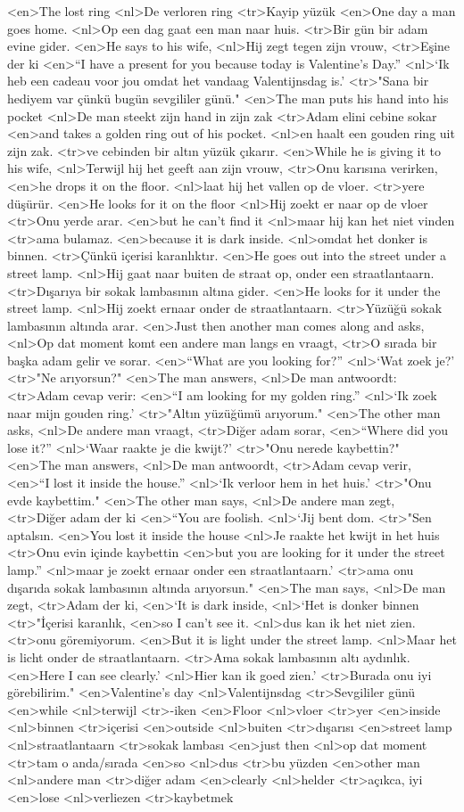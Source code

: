 <en>The lost ring
<nl>De verloren ring
<tr>Kayip yüzük
<en>One day a man goes home.
<nl>Op een dag gaat een man naar huis.
<tr>Bir gün bir adam evine gider.
<en>He says to his wife,
<nl>Hij zegt tegen zijn vrouw,
<tr>Eşine der ki
<en>“I have a present for you because today is Valentine’s Day.”
<nl>`Ik heb een cadeau voor jou omdat het vandaag Valentijnsdag is.'
<tr>"Sana bir hediyem var çünkü bugün sevgililer günü."
<en>The man puts his hand into his pocket
<nl>De man steekt zijn hand in zijn zak
<tr>Adam elini cebine sokar
<en>and takes a golden ring out of his pocket.
<nl>en haalt een gouden ring uit zijn zak.
<tr>ve cebinden bir altın yüzük çıkarır.
<en>While he is giving it to his wife,
<nl>Terwijl hij het geeft aan zijn vrouw,
<tr>Onu karısına verirken,
<en>he drops it on the floor.
<nl>laat hij het vallen op de vloer.
<tr>yere düşürür.
<en>He looks for it on the floor
<nl>Hij zoekt er naar op de vloer
<tr>Onu yerde arar.
<en>but he can’t find it
<nl>maar hij kan het niet vinden
<tr>ama bulamaz.
<en>because it is dark inside.
<nl>omdat het donker is binnen.
<tr>Çünkü içerisi karanlıktır.
<en>He goes out into the street under a street lamp.
<nl>Hij gaat naar buiten de straat op, onder een straatlantaarn.
<tr>Dışarıya bir sokak lambasının altına gider.
<en>He looks for it under the street lamp.
<nl>Hij zoekt ernaar onder de straatlantaarn. 
<tr>Yüzüğü sokak lambasının altında arar.
<en>Just then another man comes along and asks,
<nl>Op dat moment komt een andere man langs en vraagt,
<tr>O sırada bir başka adam gelir ve sorar.
<en>“What are you looking for?”
<nl>`Wat zoek je?'
<tr>"Ne arıyorsun?"
<en>The man answers,
<nl>De man antwoordt: 
<tr>Adam cevap verir:
<en>“I am looking for my golden ring.”
<nl>`Ik zoek naar mijn gouden ring.'
<tr>"Altın yüzüğümü arıyorum."
<en>The other man asks,
<nl>De andere man vraagt,
<tr>Diğer adam sorar,
<en>“Where did you lose it?”
<nl>`Waar raakte je die kwijt?'
<tr>"Onu nerede kaybettin?"
<en>The man answers,
<nl>De man antwoordt,
<tr>Adam cevap verir,
<en>“I lost it inside the house.”
<nl>`Ik verloor hem in het huis.'
<tr>"Onu evde kaybettim."
<en>The other man says,
<nl>De andere man zegt, 
<tr>Diğer adam der ki
<en>“You are foolish.
<nl>`Jij bent dom.
<tr>"Sen aptalsın.
<en>You lost it inside the house
<nl>Je raakte het kwijt in het huis
<tr>Onu evin içinde kaybettin
<en>but you are looking for it under the street lamp.”
<nl>maar je zoekt ernaar onder een straatlantaarn.'
<tr>ama onu dışarıda sokak lambasının altında arıyorsun."
<en>The man says,
<nl>De man zegt, 
<tr>Adam der ki,
<en>`It is dark inside,
<nl>`Het is donker binnen
<tr>"İçerisi karanlık,
<en>so I can’t see it.
<nl>dus kan ik het niet zien.
<tr>onu göremiyorum.
<en>But it is light under the street lamp.
<nl>Maar het is licht onder de straatlantaarn.
<tr>Ama sokak lambasının altı aydınlık.
<en>Here I can see clearly.'
<nl>Hier  kan ik goed zien.'
<tr>Burada onu iyi görebilirim."
<en>Valentine's day
<nl>Valentijnsdag 
<tr>Sevgililer günü
<en>while
<nl>terwijl
<tr>-iken
<en>Floor
<nl>vloer
<tr>yer
<en>inside
<nl>binnen 
<tr>içerisi
<en>outside
<nl>buiten
<tr>dışarısı
<en>street lamp
<nl>straatlantaarn
<tr>sokak lambası
<en>just then
<nl>op dat moment
<tr>tam o anda/sırada
<en>so
<nl>dus
<tr>bu yüzden
<en>other man
<nl>andere man
<tr>diğer adam
<en>clearly
<nl>helder
<tr>açıkca, iyi
<en>lose
<nl>verliezen
<tr>kaybetmek

